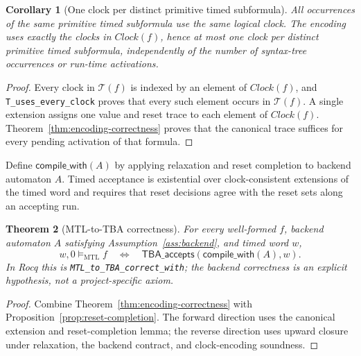 \documentclass[10pt,journal,compsoc]{IEEEtran}
\newtheorem{theorem}{Theorem}[section]
\newtheorem{corollary}[theorem]{Corollary}
\newcommand{\satM}{\models_{\mathrm{MTL}}}
\newcommand{\T}{\mathcal{T}}
\newcommand{\Clock}{\mathit{Clock}}
\begin{document}
\begin{corollary}[One clock per distinct primitive timed subformula]
\label{cor:one-clock-formula}
All occurrences of the same primitive timed subformula use the same logical
clock. The encoding uses exactly the clocks in $\Clock(f)$, hence at most
one clock per distinct primitive timed subformula, independently of the
number of syntax-tree occurrences or run-time activations.
\end{corollary}
\begin{proof}
Every clock in $\T(f)$ is indexed by an element of $\Clock(f)$, and
\texttt{T\_uses\_every\_clock} proves that every such element occurs in
$\T(f)$. A single extension assigns one value and reset trace to each
element of $\Clock(f)$. Theorem~\ref{thm:encoding-correctness} proves that
the canonical trace suffices for every pending activation of that formula.
\end{proof}

Define $\mathsf{compile\_with}(A)$ by applying relaxation and reset
completion to backend automaton $A$. Timed acceptance is existential over
clock-consistent extensions of the timed word and requires that reset
decisions agree with the reset sets along an accepting run.
\begin{theorem}[MTL-to-TBA correctness]
\label{thm:mtl-to-tba-correct}
\label{cor:mtl-tba-correct}
For every well-formed $f$, backend automaton $A$ satisfying
Assumption~\ref{ass:backend}, and timed word $w$,
\[
w,0\satM f\quad\Longleftrightarrow\quad
\mathsf{TBA\_accepts}(\mathsf{compile\_with}(A),w).
\]
In Rocq this is \texttt{MTL\_\allowbreak{}to\_\allowbreak{}TBA\_\allowbreak{}correct\_\allowbreak{}with}; the backend
correctness is an explicit hypothesis, not a project-specific axiom.
\end{theorem}
\begin{proof}
Combine Theorem~\ref{thm:encoding-correctness} with
Proposition~\ref{prop:reset-completion}. The forward direction uses the
canonical extension and reset-completion lemma; the reverse direction uses
upward closure under relaxation, the backend contract, and clock-encoding
soundness.
\end{proof}
\end{document}
